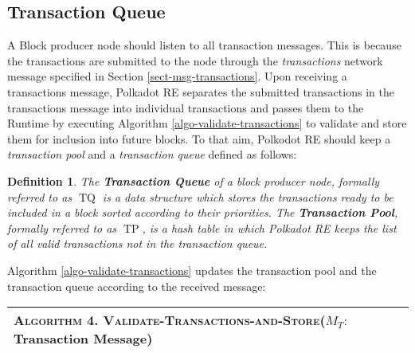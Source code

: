\documentclass{book}
\newcommand{\tmem}[1]{{\em #1\/}}
\newcommand{\tmname}[1]{\textsc{#1}}
\newcommand{\tmop}[1]{\ensuremath{\operatorname{#1}}}
\newcommand{\tmstrong}[1]{\textbf{#1}}
\newcommand{\tmtextbf}[1]{{\bfseries{#1}}}
\newcommand{\tmtextit}[1]{{\itshape{#1}}}
\newcommand{\tmtextsc}[1]{{\scshape{#1}}}
\newcounter{tmcounter}
\newcommand{\custombinding}[1]{%
  \setcounter{tmcounter}{#1}%
  \addtocounter{tmcounter}{-1}%
  \refstepcounter{tmcounter}}
\newtheorem{definition}{Definition}
\providecommand{\tmem}[1]{\tmtextit{#1}}
\providecommand{\tmname}[1]{\tmtextsc{#1}}
\providecommand{\tmop}[1]{\ensuremath{\mathrm{#1}}}
\providecommand{\tmstrong}[1]{\tmtextbf{#1}}
\providecommand{\tmtextbf}[1]{\tmtextbf{#1}}
\providecommand{\tmtextit}[1]{\tmtextit{#1}}
\newtheorem{definition}{Definition}
\begin{document}
\subsection{Transaction Queue}

A Block producer node should listen to all transaction
messages{\tmem{{}}}. This is because the
transactions are submitted to the node through the {\tmem{transactions}}
network message specified in Section \ref{sect-msg-transactions}. Upon
receiving a transactions message, Polkadot RE separates the submitted
transactions in the transactions message into individual transactions and
passes them to the Runtime by executing Algorithm
\ref{algo-validate-transactions} to validate and store them for inclusion into
future blocks. To that aim, Polkodot RE should keep a {\tmem{transaction
pool{}}} and a {\tmem{transaction
queue}}{} defined as follows:

\begin{definition}
  The {\tmstrong{Transaction Queue}} of a block producer node, formally
  referred to as $\tmop{TQ}$ is a data structure which stores the transactions
  ready to be included in a block sorted according to their priorities. The
  {\tmstrong{Transaction Pool}}, formally referred to as $\tmop{TP}$, is a
  hash table in which Polkadot RE keeps the list of all valid transactions not
  in the transaction queue. \ 
\end{definition}

Algorithm \ref{algo-validate-transactions} updates the transaction pool and
the transaction queue according to the received message:

\custombinding{4}{\noindent}\begin{tabular}{l}
  \hline
  \tmtextsc{Algorithm  4. }
  \label{algo-validate-transactions}{\tmname{Validate-Transactions-and-Store}}($M_T
  :$Transaction Message)\\
  \hline
\end{tabular}
\end{document}
